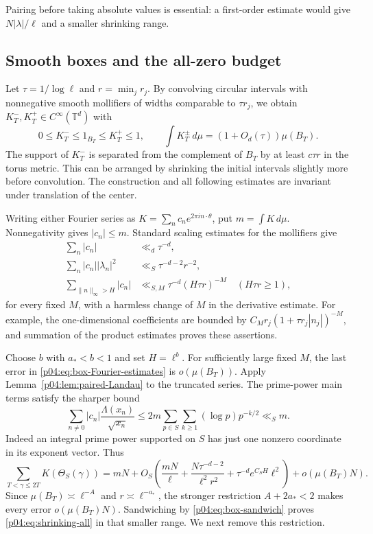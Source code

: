 \documentclass[11pt,letterpaper]{article}
\theoremstyle{definition}
\theoremstyle{remark}
\newcommand{\1}{\mathbf 1}
\begin{document}
Pairing before taking absolute values is essential: a first-order
estimate would give $N|\lambda|/\ell$ and a smaller shrinking range.

\subsection{Smooth boxes and the all-zero budget}

Let $\tau=1/\log\ell$ and $r=\min_jr_j$.  By convolving circular
intervals with nonnegative smooth mollifiers of widths comparable to
$\tau r_j$, we obtain $K^-_T,K^+_T\in C^\infty(\mathbb T^d)$ with
\begin{equation}\label{p04:eq:box-sandwich}
 0\le K^-_T\le1_{B_T}\le K^+_T\le1,
 \qquad \int K^\pm_T\,d\mu=(1+O_d(\tau))\mu(B_T).
\end{equation}
The support of $K^-_T$ is separated from the complement of $B_T$ by
at least $c\tau r$ in the torus metric.  This can be arranged by
shrinking the initial intervals slightly more before convolution.
The construction and all following estimates are invariant under
translation of the center.

Writing either Fourier series as
$K=\sum_n c_n e^{2\pi in\cdot\theta}$, put $m=\int K\,d\mu$.
Nonnegativity gives $|c_n|\le m$.  Standard scaling estimates for
the mollifiers give
\begin{align}
 \sum_n|c_n|&\ll_d\tau^{-d},\\
 \sum_n|c_n||\lambda_n|^2
       &\ll_S\tau^{-d-2}r^{-2},\\
 \sum_{\|n\|_\infty>H}|c_n|
       &\ll_{S,M}\tau^{-d}(H\tau r)^{-M}
       \quad(H\tau r\ge1),
                 \label{p04:eq:box-Fourier-estimates}
\end{align}
for every fixed $M$, with a harmless change of $M$ in the derivative
estimate. For example, the one-dimensional coefficients are bounded
by $C_Mr_j(1+\tau r_j|n_j|)^{-M}$, and summation of the product
estimates proves these assertions.

Choose $b$ with $a_*<b<1$ and set $H=\ell^b$.
For sufficiently large fixed $M$, the last error in
\eqref{p04:eq:box-Fourier-estimates} is $o(\mu(B_T))$.  Apply
Lemma~\ref{p04:lem:paired-Landau} to the truncated series.  The prime-power
main terms satisfy the sharper bound
\[
 \sum_{n\ne0}|c_n|\frac{\Lambda(x_n)}{\sqrt{x_n}}
 \le 2m\sum_{p\in S}\sum_{k\ge1}(\log p)p^{-k/2}
 \ll_S m.
\]
Indeed an integral prime power supported on $S$ has just one nonzero
coordinate in its exponent vector.  Thus
\begin{equation}\label{p04:eq:smooth-box-zero-count}
 \sum_{T<\gamma\le2T}K(\Theta_S(\gamma))
 =mN+O_S\left(\frac{mN}{\ell}
       +\frac{N\tau^{-d-2}}{\ell^2r^2}
       +\tau^{-d}e^{C_SH}\ell^2\right)+o(\mu(B_T)N).
\end{equation}
Since $\mu(B_T)\asymp\ell^{-A}$ and $r\asymp\ell^{-a_*}$,
the stronger restriction $A+2a_*<2$ makes every error
$o(\mu(B_T)N)$. Sandwiching by \eqref{p04:eq:box-sandwich} proves
\eqref{p04:eq:shrinking-all} in that smaller range.  We next remove this
restriction.
\end{document}
